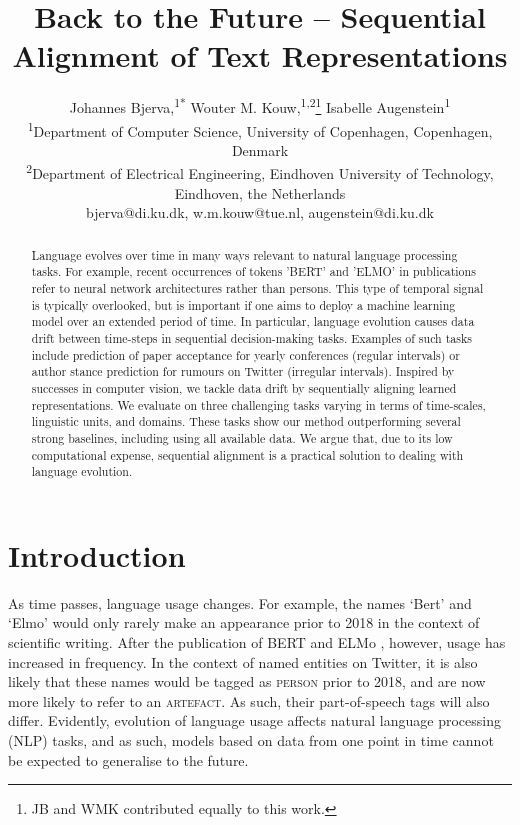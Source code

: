 \documentclass[letterpaper]{article} %
\title{Back to the Future -- Sequential Alignment of Text Representations}
\author{Johannes Bjerva,\textsuperscript{\rm 1*} Wouter M. Kouw,\textsuperscript{\rm 1,2}\thanks{JB and WMK contributed equally to this work.}
Isabelle Augenstein\textsuperscript{\rm 1}\\  %
\textsuperscript{\rm 1}Department of Computer Science, University of Copenhagen, Copenhagen, Denmark \\
\textsuperscript{\rm 2}Department of Electrical Engineering, Eindhoven University of Technology, Eindhoven, the Netherlands\\
bjerva@di.ku.dk, w.m.kouw@tue.nl, augenstein@di.ku.dk
}
\begin{document}
\maketitle

\begin{abstract}
  Language evolves over time in many ways relevant to natural language processing tasks. For example, recent occurrences of tokens 'BERT' and 'ELMO' in publications refer to neural network architectures rather than persons. This type of temporal signal is typically overlooked, but is important if one aims to deploy a machine learning model over an extended period of time. In particular, language evolution causes data drift between time-steps in sequential decision-making tasks. Examples of such tasks include prediction of paper acceptance for yearly conferences (regular intervals) or author stance prediction for rumours on Twitter (irregular intervals). Inspired by successes in computer vision, we tackle data drift by sequentially aligning learned representations. %
  We evaluate on three challenging tasks varying in terms of time-scales, linguistic units, and domains. These tasks show our method outperforming several strong baselines, including using all available data. We argue that, due to its low computational expense, sequential alignment is a practical solution to dealing with language evolution.
\end{abstract}


\section{Introduction}
\noindent As time passes, language usage changes.
For example, the names `Bert' and `Elmo' would only rarely make an appearance prior to 2018 in the context of scientific writing. After the publication of BERT \cite{bert} and ELMo \cite{elmo}, however, usage has increased in frequency. In the context of named entities on Twitter, it is also likely that these names would be tagged as \textsc{person} prior to 2018, and are now more likely to refer to an \textsc{artefact}. As such, their part-of-speech tags will also differ. Evidently, evolution of language usage affects natural language processing (NLP) tasks, and as such, models based on data from one point in time cannot be expected to generalise to the future.
\end{document}
